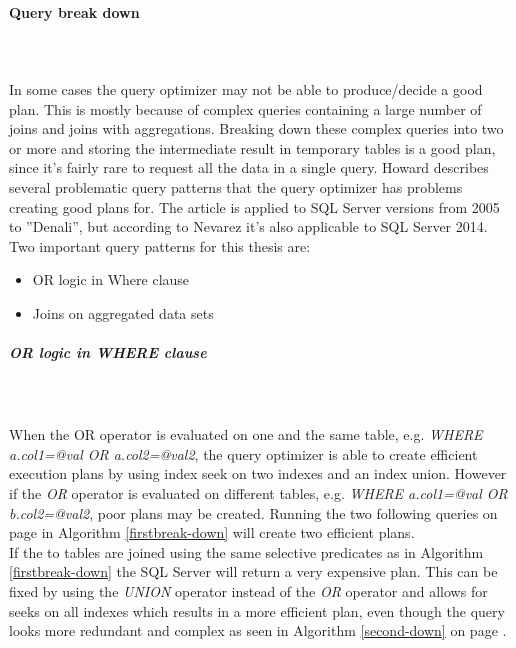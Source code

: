\documentclass{cslthse-msc}
\begin{document}
\paragraph*{Query break down}\mbox{}\\\\ 
In some cases the query optimizer may not be able to produce/decide a good plan. This is mostly because of complex queries containing a large number of joins and joins with aggregations. Breaking down these complex queries into two or more and storing the intermediate result in temporary tables is a good plan, since it's fairly rare to request all the data in a single query. 
Howard\cite{break-down} describes several problematic query patterns that the query optimizer has problems creating good plans for. The article is applied to SQL Server versions from 2005 to ''Denali'', but according to Nevarez\cite{Nevarez} it's also applicable to SQL Server 2014.\\ Two important query patterns for this thesis are:
\begin{itemize}
\item OR logic in Where clause
\item Joins on aggregated data sets
\end{itemize}

\subparagraph{\textit{OR} logic in \textit{WHERE} clause}\mbox{}\\\\
When the OR operator is evaluated on one and the same table, e.g. \textit{WHERE a.col1=@val OR a.col2=@val2}, the query optimizer is able to create efficient execution plans by using index seek on two indexes and an index union. However if the \textit{OR} operator is evaluated on different tables, e.g. \textit{WHERE a.col1=@val OR b.col2=@val2}, poor plans may be created. Running the two following queries on page \pageref{lst:fragalg} in Algorithm \ref{firstbreak-down} will create two efficient plans.\\

If the to tables are joined using the same selective predicates as in Algorithm \ref{firstbreak-down} the SQL Server will return a very expensive plan. This can be fixed by using the \textit{UNION} operator instead of the \textit{OR} operator and allows for seeks on all indexes which results in a more efficient plan, even though the query looks more redundant and complex as seen in Algorithm \ref{second-down} on page \pageref{lst:union}.
\end{document}
